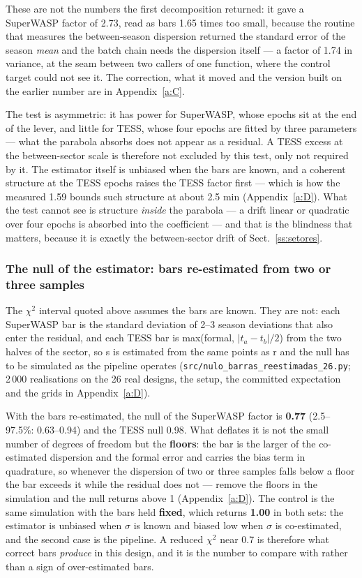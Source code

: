 \documentclass{aa}
\begin{document}
These are not the numbers the first decomposition returned: it gave a SuperWASP factor of 2.73, read as bars 1.65 times too small, because the routine that measures the between-season dispersion returned the standard error of the season \textit{mean} and the batch chain needs the dispersion itself --- a factor of 1.74 in variance, at the seam between two callers of one function, where the control target could not see it. The correction, what it moved and the version built on the earlier number are in Appendix~\ref{a:C}.

The test is asymmetric: it has power for SuperWASP, whose epochs sit at the end of the lever, and little for TESS, whose four epochs are fitted by three parameters --- what the parabola absorbs does not appear as a residual. A TESS excess at the between-sector scale is therefore not excluded by this test, only not required by it. The estimator itself is unbiased when the bars are known, and a coherent structure at the TESS epochs raises the TESS factor first --- which is how the measured 1.59 bounds such structure at about 2.5 min (Appendix~\ref{a:D}). What the test cannot see is structure \textit{inside} the parabola --- a drift linear or quadratic over four epochs is absorbed into the coefficient --- and that is the blindness that matters, because it is exactly the between-sector drift of Sect.~\ref{ss:setores}.


\subsubsection{The null of the estimator: bars re-estimated from two or three samples}\label{sss:nulo}
The $\chi^2$ interval quoted above assumes the bars are known. They are not: each SuperWASP bar is the standard deviation of 2--3 season deviations that also enter the residual, and each TESS bar is max(formal, $|t_a - t_b|/2$) from the two halves of the sector, so s is estimated from the same points as r and the null has to be simulated as the pipeline operates (\texttt{src/\allowbreak nulo\_\allowbreak barras\_\allowbreak reestimadas\_\allowbreak 26.py}; 2\,000 realisations on the 26 real designs, the setup, the committed expectation and the grids in Appendix~\ref{a:D}).

With the bars re-estimated, the null of the SuperWASP factor is \textbf{0.77} (2.5--97.5\%: 0.63--0.94) and the TESS null 0.98. What deflates it is not the small number of degrees of freedom but the \textbf{floors}: the bar is the larger of the co-estimated dispersion and the formal error and carries the bias term in quadrature, so whenever the dispersion of two or three samples falls below a floor the bar exceeds it while the residual does not --- remove the floors in the simulation and the null returns above 1 (Appendix~\ref{a:D}). The control is the same simulation with the bars held \textbf{fixed}, which returns \textbf{1.00} in both sets: the estimator is unbiased when $\sigma$ is known and biased low when $\sigma$ is co-estimated, and the second case is the pipeline. A reduced $\chi^2$ near 0.7 is therefore what correct bars \textit{produce} in this design, and it is the number to compare with rather than a sign of over-estimated bars.
\end{document}
